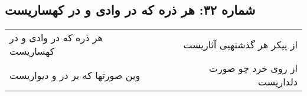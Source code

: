 \begin{center}
\section*{شماره ۳۲: هر ذره که در وادی و در کهساریست}
\label{sec:032}
\begin{longtable}{l p{0.5cm} r}
هر ذره که در وادی و در کهساریست
&&
از پیکر هر گذشتهیی آثاریست
\\
وین صورتها که بر در و دیواریست
&&
از روی خرد چو صورت دلداریست
\\
\end{longtable}
\end{center}
